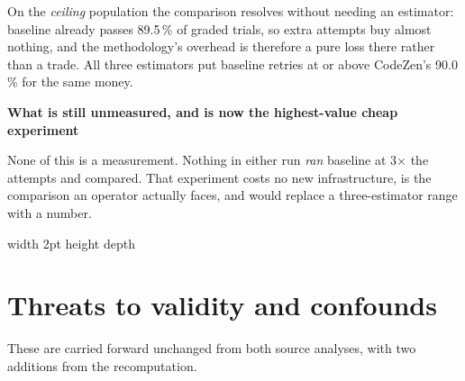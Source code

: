 \documentclass[11pt,a4paper]{article}
\newenvironment{finding}[1]
  {\par\medskip\noindent\begin{lrbox}{\findingbox}%
   \begin{minipage}{\dimexpr\linewidth-2\fboxsep-4pt}%
   \vspace{3pt}\textbf{\color{accent}#1}\par\smallskip\small}
  {\vspace{4pt}\end{minipage}\end{lrbox}%
   \noindent\textcolor{accent}{\vrule width 2pt height \dimexpr\ht\findingbox\relax depth \dimexpr\dp\findingbox\relax}%
   \colorbox{shade}{\usebox{\findingbox}}\par\medskip}
\begin{document}
\noindent On the \emph{ceiling} population the comparison resolves without needing an
estimator: baseline already passes 89.5\,\% of graded trials, so extra attempts buy almost
nothing, and the methodology's overhead is therefore a pure loss there rather than a trade.
All three estimators put baseline retries at or above CodeZen's 90.0\,\% for the same money.

\begin{finding}{What is still unmeasured, and is now the highest-value cheap experiment}
None of this is a measurement. Nothing in either run \emph{ran} baseline at 3$\times$ the
attempts and compared. That experiment costs no new infrastructure, is the comparison an
operator actually faces, and would replace a three-estimator range with a number.
\end{finding}

\clearpage
\section{Threats to validity and confounds}
\label{sec:threats}

These are carried forward unchanged from both source analyses, with two additions from the
recomputation.
\end{document}
